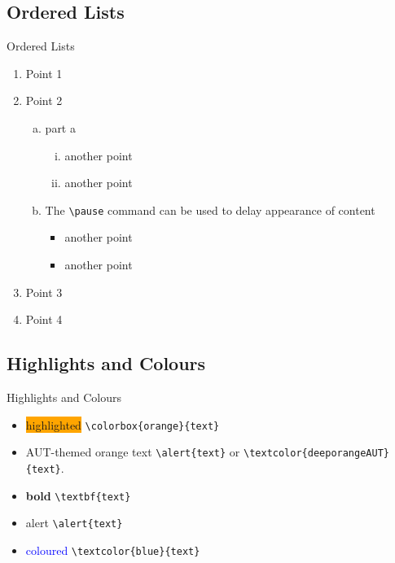 \documentclass[aspectratio=169, 12pt]{beamer}    %
\begin{document}
\subsection{Ordered Lists}
\begin{frame}[fragile]{Ordered Lists}
    \begin{enumerate}%
    \item Point 1 
    \item Point 2 
    \begin{enumerate}[a.]
        \item part a 
            \begin{enumerate}[i.]
                \item another point
                \item another point
            \end{enumerate} \pause
        \item The \verb|\pause| command can be used to delay appearance of content 
            \begin{itemize}%
                \item another point
                \item another point
            \end{itemize}
    \end{enumerate}
    \item Point 3 
    \item Point 4 
    \end{enumerate}
\end{frame}



\subsection{Highlights and Colours}
\begin{frame}[fragile]{Highlights and Colours}

\begin{itemize}
\item 
    \colorbox{orange}{highlighted}  \verb|\colorbox{orange}{text}|
\item     
     \alert{AUT-themed orange text}  \verb|\alert{text}| or \verb|\textcolor{deeporangeAUT}{text}|.    
\item  \textbf{bold} \verb|\textbf{text}|
\item  \alert{alert} \verb|\alert{text}|
\item  \textcolor{blue}{coloured} \verb|\textcolor{blue}{text}|
  

\end{itemize}
    
    
\end{frame}
\end{document}
